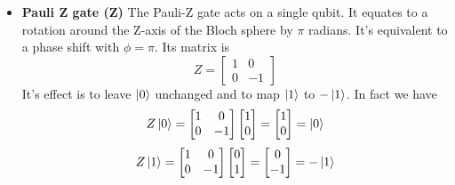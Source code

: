 \documentclass[main.tex]{subfiles}
\begin{document}
\begin{itemize}
	\item \textbf{Pauli Z gate (Z)} The Pauli-Z gate acts on a single qubit. It equates to a rotation around 
	the Z-axis of the Bloch sphere by $\pi$ radians. It's equivalent to a phase shift with $\phi=\pi$.
	Its matrix is
	\begin{equation}
	Z=
	\begin{bmatrix}
	1 & 0\\
	0 & -1
	\end{bmatrix}
	\end{equation}
	It's effect is to leave $\ket{0}$ unchanged and to map $\ket{1}$ to $-\ket{1}$. In fact we have
	$$
	Z\ket{0}=
	\begin{bmatrix}
	1 & 0\\
	0 & -1
	\end{bmatrix}
	\begin{bmatrix}
	1 \\
	0
	\end{bmatrix}
	=
	\begin{bmatrix}
	1 \\
	0
	\end{bmatrix}
	=
	\ket{0}
	$$
	$$
	Z\ket{1}=
	\begin{bmatrix}
	1 & 0\\
	0 & -1
	\end{bmatrix}
	\begin{bmatrix}
	0 \\
	1
	\end{bmatrix}
	=
	\begin{bmatrix}
	0 \\
	-1
	\end{bmatrix}
	=
	-\ket{1}
	$$	
	\end{itemize}
\end{document}
